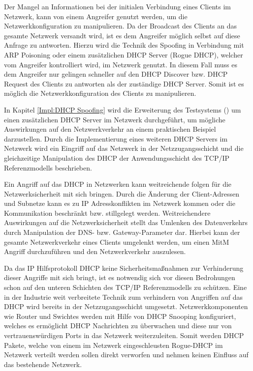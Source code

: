 Der Mangel an Informationen bei der initialen Verbindung eines Clients im Netzwerk, kann von einem Angreifer genutzt werden, um die Netzwerkkonfiguration zu manipulieren. Da der Broadcast des Clients an das gesamte Netzwerk versandt wird, ist es dem Angreifer möglich selbst auf diese Anfrage zu antworten. Hierzu wird die Technik des Spoofing in Verbindung mit \ac{ARP} Poisoning oder einem zusätzlichen \ac{DHCP} Server (Rogue \ac{DHCP}), welcher vom Angreifer kontrolliert wird, im Netzwerk genutzt. In diesem Fall muss es dem Angreifer nur gelingen schneller auf den \ac{DHCP} Discover bzw. \ac{DHCP} Request des Clients zu antworten als der zuständige \ac{DHCP} Server. Somit ist es möglich die Netzwerkkonfiguration des Clients zu manipulieren.

In Kapitel \autoref{Impl:DHCP Spoofing} wird die Erweiterung des Testsystems (\cite{Weber2018}) um einen zusätzlichen \ac{DHCP} Server im Netzwerk durchgeführt, um mögliche Auswirkungen auf den Netzwerkverkehr an einem praktischen Beispiel darzustellen. Durch die Implementierung eines weiteren \ac{DHCP} Servers im Netzwerk wird ein Eingriff auf das Netzwerk in der Netzzugangsschicht und die gleichzeitige Manipulation des \ac{DHCP} der Anwendungsschicht des \ac{TCP}/\ac{IP} Referenzmodells beschrieben.

Ein Angriff auf das \ac{DHCP} in Netzwerken kann weitreichende folgen für die Netzwerksicherheit mit sich bringen. Durch die Änderung der Client-Adressen und Subnetze kann es zu \ac{IP} Adresskonflikten im Netzwerk kommen oder die Kommunikation beschränkt bzw. stillgelegt werden. Weitreichendere Auswirkungen auf die Netzwerksicherheit stellt das Umlenken des Datenverkehrs durch Manipulation der \ac{DNS}- bzw. Gateway-Parameter dar. Hierbei kann der gesamte Netzwerkverkehr eines Clients umgelenkt werden, um einen \ac{MitM} Angriff durchzuführen und den Netzwerkverkehr auszulesen.

Da das \ac{IP} Hilfsprotokoll \ac{DHCP} keine Sicherheitsmaßnahmen zur Verhinderung dieser Angriffe mit sich bringt, ist es notwendig sich vor diesen Bedrohungen schon auf den unteren Schichten des \ac{TCP}/\ac{IP} Referenzmodells zu schützen. Eine in der Industrie weit verbreitete Technik zum verhindern von Angriffen auf das \ac{DHCP} wird bereits in der Netzzugangsschicht umgesetzt. Netzwerkkomponenten wie Router und Swichtes werden mit Hilfe von \ac{DHCP} Snooping konfiguriert, welches es ermöglicht \ac{DHCP} Nachrichten zu überwachen und diese nur von vertrauenswürdigen Ports in das Netzwerk weiterzuleiten. Somit werden \ac{DHCP} Pakete, welche von einem im Netzwerk eingeschleusten Rogue-DHCP im Netzwerk verteilt werden sollen direkt verworfen und nehmen keinen Einfluss auf das bestehende Netzwerk.

